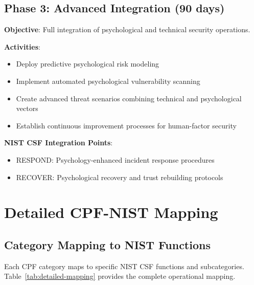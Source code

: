 \documentclass[11pt,a4paper]{article}
\begin{document}
\subsection{Phase 3: Advanced Integration (90 days)}

\textbf{Objective}: Full integration of psychological and technical security operations.

\textbf{Activities}:
\begin{itemize}
\item Deploy predictive psychological risk modeling
\item Implement automated psychological vulnerability scanning
\item Create advanced threat scenarios combining technical and psychological vectors
\item Establish continuous improvement processes for human-factor security
\end{itemize}

\textbf{NIST CSF Integration Points}:
\begin{itemize}
\item RESPOND: Psychology-enhanced incident response procedures
\item RECOVER: Psychological recovery and trust rebuilding protocols
\end{itemize}

\section{Detailed CPF-NIST Mapping}

\subsection{Category Mapping to NIST Functions}

Each CPF category maps to specific NIST CSF functions and subcategories. Table~\ref{tab:detailed-mapping} provides the complete operational mapping.
\end{document}
